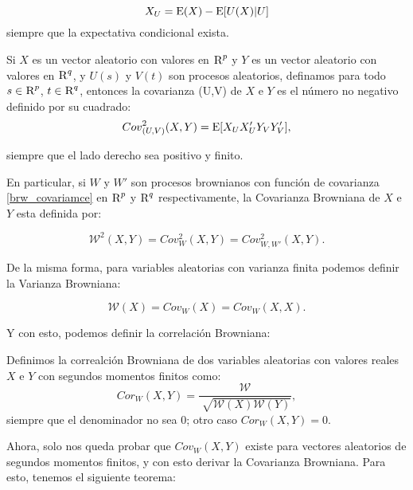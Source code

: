 		$$
			X_U=\operatorname{E}(X)-\operatorname{E}[U(X)|U]
		$$
		siempre que la expectativa condicional exista.

		\begin{defn}
			Si $X$ es un vector aleatorio con valores en $\textsc{R}^p$ y $Y$ es un vector aleatorio con valores en $\textsc{R}^q$, y $U(s)$ y $V(t)$ son procesos aleatorios, definamos para todo $s\in\textsc{R}^p$, $t\in\textsc{R}^q$, entonces la covarianza (U,V) de $X$ e $Y$ es el n\'umero no negativo definido por su cuadrado:
			\begin{equation}\label{eq_35_brcov}
				{Cov}^2_{(U,V)}(X,Y) = \operatorname{E}[X_U X'_U Y_V Y'_V],
			\end{equation}
				
			siempre que el lado derecho sea positivo y finito.
		\end{defn}

		En particular, si ${W}$ y ${W'}$ son procesos brownianos con funci\'on de covarianza \ref{brw_covariamce} en $\textsc{R}^p$ y $\textsc{R}^q$ respectivamente, la Covarianza Browniana de $X$ e $Y$ esta definida por:

		\begin{equation}
			\mathcal{W}^2(X,Y) = Cov^2_W(X,Y) = Cov^2_{W,W'}(X,Y).
		\end{equation}

		De la misma forma, para variables aleatorias con varianza finita podemos definir la Varianza Browniana:

		\begin{equation}
			\mathcal{W}(X) = Cov_W(X) = Cov_{W}(X,X).
		\end{equation}
		
		Y con esto, podemos definir la correlaci\'on Browniana:
		
		\begin{defn}
			Definimos la correalci\'on Browniana de dos variables aleatorias con valores reales $X$ e $Y$ con segundos momentos finitos como:
			\begin{equation}	
				Cor_W(X,Y) = \frac{\mathcal{W}}{\sqrt[]{\mathcal{W}(X)\mathcal{W}(Y)}},
			\end{equation}
			siempre que el denominador no sea 0; otro caso $Cor_W(X,Y) = 0$.
		\end{defn}

		Ahora, solo nos queda probar que $Cov_W(X,Y)$ existe para vectores aleatorios de segundos momentos finitos, y con esto derivar la Covarianza Browniana. Para esto, tenemos el siguiente teorema:

